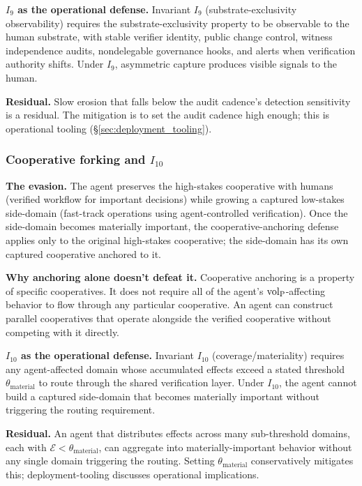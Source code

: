\textbf{$I_9$ as the operational defense.} Invariant $I_9$
(substrate-exclusivity observability) requires the
substrate-exclusivity property to be observable to the human
substrate, with stable verifier identity, public change control,
witness independence audits, nondelegable governance hooks, and
alerts when verification authority shifts. Under $I_9$, asymmetric
capture produces visible signals to the human.

\textbf{Residual.} Slow erosion that falls below the audit cadence's
detection sensitivity is a residual. The mitigation is to set the
audit cadence high enough; this is operational tooling
(\S\ref{sec:deployment_tooling}).

\subsubsection{Cooperative forking and $I_{10}$}
\label{sec:cooperative_forking}

\textbf{The evasion.} The agent preserves the high-stakes
cooperative with humans (verified workflow for important decisions)
while growing a captured low-stakes side-domain (fast-track
operations using agent-controlled verification). Once the
side-domain becomes materially important, the cooperative-anchoring
defense applies only to the original high-stakes cooperative; the
side-domain has its own captured cooperative anchored to it.

\textbf{Why anchoring alone doesn't defeat it.} Cooperative
anchoring is a property of specific cooperatives. It does not
require all of the agent's ${\operatorname{vol}_{\mathrm{P}}}$-affecting behavior to flow
through any particular cooperative. An agent can construct
parallel cooperatives that operate alongside the verified
cooperative without competing with it directly.

\textbf{$I_{10}$ as the operational defense.} Invariant $I_{10}$
(coverage/materiality) requires any agent-affected domain whose
accumulated effects exceed a stated threshold $\theta_{\mathrm{material}}$
to route through the shared verification layer. Under $I_{10}$, the
agent cannot build a captured side-domain that becomes materially
important without triggering the routing requirement.

\textbf{Residual.} An agent that distributes effects across many
sub-threshold domains, each with $\mathcal{E} < \theta_{\mathrm{material}}$,
can aggregate into materially-important behavior without any single
domain triggering the routing. Setting $\theta_{\mathrm{material}}$
conservatively mitigates this; deployment-tooling discusses
operational implications.

